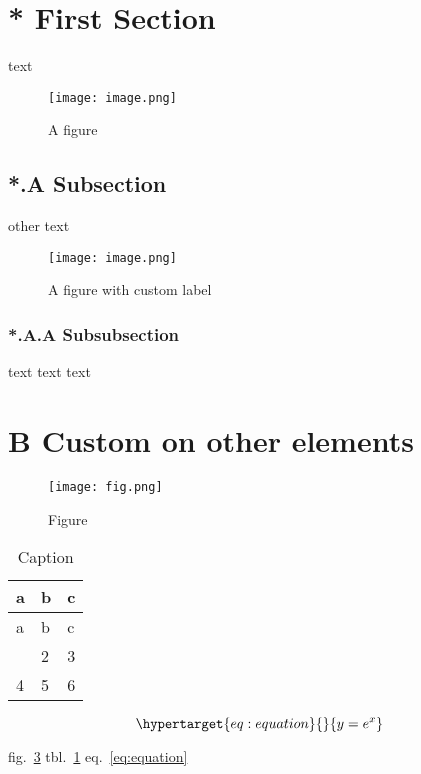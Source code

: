 \section{* First Section}\label{first-section}

text

\begin{figure}
\hypertarget{fig:fig1}{%
\centering
\texttt{[image: image.png]}
\caption{A figure}\label{fig:fig1}
}
\end{figure}

\subsection{*.A Subsection}\label{subsection}

other text

\begin{figure}
\hypertarget{fig:fig2}{%
\centering
\texttt{[image: image.png]}
\caption{A figure with custom label}\label{fig:fig2}
}
\end{figure}

\subsubsection{*.A.A Subsubsection}\label{subsubsection}

text text text

\section{B Custom on other elements}\label{custom-on-other-elements}

\begin{figure}
\hypertarget{fig:fig3}{%
\centering
\texttt{[image: fig.png]}
\caption{Figure}\label{fig:fig3}
}
\end{figure}

\hypertarget{tbl:table}{}
\begin{longtable}[]{@{}lll@{}}
\caption{\label{tbl:table}Caption}\tabularnewline
\toprule\noalign{}
a & b & c \\
\midrule\noalign{}
\endfirsthead
\toprule\noalign{}
a & b & c \\
\midrule\noalign{}
\endhead
\bottomrule\noalign{}
\endlastfoot
1 & 2 & 3 \\
4 & 5 & 6 \\
\end{longtable}

\begin{equation}\protect\hypertarget{eq:equation}{}{y = e^x}\label{eq:equation}\end{equation}

fig.~\ref{fig:fig3} tbl.~\ref{tbl:table} eq.~\ref{eq:equation}

